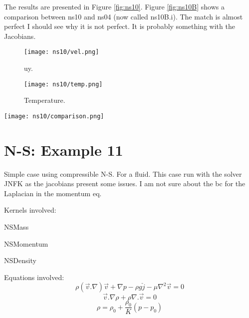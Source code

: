 \documentclass[11pt,letterpaper]{article}
\begin{document}
The results are presented in Figure \ref{fig:ns10}. Figure \ref{fig:ns10B} shows a comparison between ns10 and ns04 (now called ns10B.i). The match is almost perfect I should see why it is not perfect. It is probably something with the Jacobians.

\begin{figure*}[!h]
	\centering
	\begin{subfigure}[t]{0.4\textwidth}
		\centering
		\texttt{[image: ns10/vel.png]} 
		\caption{uy.}
		\label{fig:ns10-vel}
	\end{subfigure}
	\vspace{1cm}
	\begin{subfigure}[t]{0.4\textwidth}
		\centering
		\texttt{[image: ns10/temp.png]}
		\caption{Temperature.}
		\label{fig:ns10-temp}
	\end{subfigure}
	\hfill
	\caption{Temperature.}
	\label{fig:ns10}
\end{figure*}

\begin{figure*}[!h]
	\centering
	\texttt{[image: ns10/comparison.png]} 
	\hfill
	\caption{Comparison between INS and my model.}
	\label{fig:ns10B}
\end{figure*}


\section{N-S: Example 11}

Simple case using compressible N-S. For a fluid.
This case run with the solver JNFK as the jacobians present some issues.
I am not sure about the bc for the Laplacian in the momentum eq.

Kernels involved:
\begin{description}[font=$\bullet$\scshape\bfseries]
	\item[] NSMass
	\item[] NSMomentum
	\item[] NSDensity
\end{description}

Equations involved:
\begin{equation}
\rho (\vec{v}.\nabla)\vec{v} + \nabla p - \rho g \check{j} - \mu \nabla^{2}\vec{v} = 0
\end{equation}
\begin{equation}
\vec{v}.\nabla\rho+\rho\nabla.\vec{v}=0
\end{equation}
\begin{equation}
\rho = \rho_{0} + \frac{\rho_{0}}{K}(p-p_{0})
\end{equation}
\end{document}
